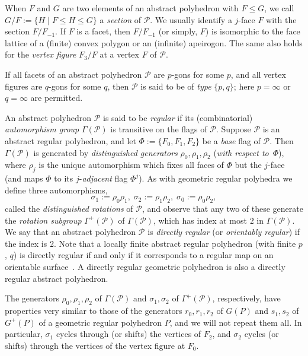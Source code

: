 \documentclass[12pt]{article}
\theoremstyle{definition}\newtheorem{definition}{Definition}[section]
\begin{document}
When $F$ and $G$ are two elements of an abstract polyhedron with $F \leq G$, we call
$G/F := \{H \mid F \leq H \leq G\}$ 
a \textit{section} of $\mathcal{P}$. We usually identify a $j$-face $F$ with the section $F/F_{-1}$. If $F$ is a facet, then $F/F_{-1}$ (or simply, $F$) is isomorphic to the face lattice of a (finite) convex polygon or an (infinite) apeirogon. The same also holds for the \textit{vertex figure } $F_{3}/F$ at a vertex $F$ of $\mathcal{P}$.
\smallskip

If all facets of an abstract polyhedron $\mathcal{P}$ are $p$-gons for some $p$, and all vertex figures are $q$-gons for some $q$, then $\mathcal{P}$ is said to be of {\em type\/} $\{p,q\}$; here $p=\infty$ or $q=\infty$ are permitted. 
\smallskip

An abstract polyhedron $\mathcal{P}$ is said to be {\em regular\/} if its (combinatorial) {\em automorphism group\/} $\Gamma(\mathcal{P})$ is transitive on the flags of $\mathcal{P}$. Suppose $\mathcal{P}$ is an abstract regular polyhedron, and let $\Phi := \{F_{0},F_{1},F_{2}\}$ be a {\em base\/} flag of $\mathcal{P}$. Then $\Gamma(\mathcal{P})$ is generated by {\em distinguished generators\/} $\rho_{0},\rho_{1},\rho_{2}$ ({\em with respect to\/}~$\Phi$), where $\rho_{j}$ is the unique automorphism which fixes all faces of $\Phi$ but the $j$-face (and maps $\Phi$ to its $j$-\textit{adjacent} flag $\Phi^j$). As with geometric regular polyhedra we define three automorphisms, 
\[\sigma_1:=\rho_0\rho_1,\; \sigma_2:= \rho_1\rho_2,\; \sigma_0:= \rho_0\rho_2,\]
called the \textit{distinguished rotations} of $\mathcal{P}$, and observe that any two of these generate the \textit{rotation subgroup} $\Gamma^+(\mathcal{P})$ of $\Gamma(\mathcal{P})$, which has index at most $2$ in $\Gamma(\mathcal{P})$. We say that an abstract polyhedron $\mathcal{P}$ is \textit{directly regular} (or \textit{orientably regular}) if the index is 2. Note that a locally finite abstract regular polyhedron (with finite $p$, $q$) is directly regular if and only if it corresponds to a regular map on an orientable surface~\cite{Conder}. A directly regular geometric polyhedron is also a directly regular abstract polyhedron.
\smallskip

The generators $\rho_0,\rho_1,\rho_2$ of $\Gamma(\mathcal{P})$ and $\sigma_1,\sigma_2$ of $\Gamma^+(\mathcal{P})$, respectively, have properties very similar to those of the generators $r_0,r_1,r_2$ of $G(P)$ and $s_1,s_2$ of $G^+(P)$ of a geometric regular polyhedron $P$, and we will not repeat them all. In particular, $\sigma_1$ cycles through (or shifts) the vertices of $F_2$, and $\sigma_2$ cycles (or shifts) through the vertices of the vertex figure at $F_0$. 
\smallskip
\end{document}
